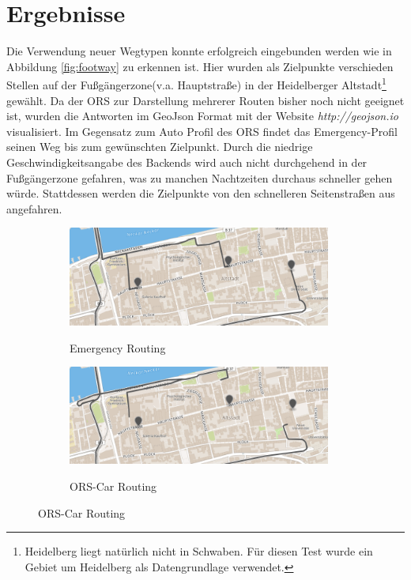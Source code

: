 \section{Ergebnisse}

Die Verwendung neuer Wegtypen konnte erfolgreich eingebunden werden wie in Abbildung \ref{fig:footway} zu erkennen ist. Hier wurden als Zielpunkte verschieden Stellen auf der Fußgängerzone(v.a. Hauptstraße) in der Heidelberger Altstadt\footnote{Heidelberg liegt natürlich nicht in Schwaben. Für diesen Test wurde ein Gebiet um Heidelberg als Datengrundlage verwendet.} gewählt. Da der ORS zur Darstellung mehrerer Routen bisher noch nicht geeignet ist, wurden die Antworten im GeoJson Format mit der Website \textit{http://geojson.io} visualisiert. Im Gegensatz zum Auto Profil des ORS findet das Emergency-Profil seinen Weg bis zum gewünschten Zielpunkt. Durch die niedrige Geschwindigkeitsangabe des Backends wird auch nicht durchgehend in der Fußgängerzone gefahren, was zu manchen Nachtzeiten durchaus schneller gehen würde. Stattdessen werden die Zielpunkte von den schnelleren Seitenstraßen aus angefahren.

\begin{figure}[h]
\centering
\caption{Routing in die Fußgängerzone der Heidelberger Altstadt}
\label{fig:footway}
\begin{subfigure}{0.49\textwidth}
\centering
\includegraphics[width = 0.95\textwidth]{../media/Altstadt_emergency.png} \\
\caption{Emergency Routing}
\label{fig:alteme}
\end{subfigure}
\begin{subfigure}{0.49\textwidth}
\centering
\includegraphics[width = 0.95\textwidth]{../media/Altstadt_car.png} \\
\caption{ORS-Car Routing}
\label{fig:altcar}
\end{subfigure}
\end{figure}

